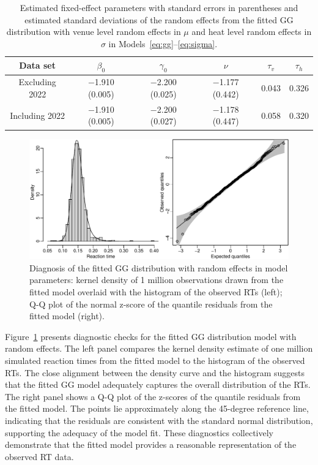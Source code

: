 \documentclass[12pt, letterpaper]{article}
\begin{document}
\begin{table}
  \centering
  \caption{Estimated fixed-effect parameters with standard errors in
    parentheses and estimated standard deviations of the random effects from the
    fitted GG distribution with venue level random
    effects in $\mu$ and heat level random effects in $\sigma$ in
    Models~\eqref{eq:gg}--\eqref{eq:sigma}.}
  \label{tab:ggfit}
  \begin{tabular}{c c c c c c}
    \toprule
    Data set & $\beta_0$ & $\gamma_0$ & $\nu$ & $\tau_v$ & $\tau_h$ \\
    \midrule
    Excluding 2022 & $-$1.910 (0.005) & $-$2.200 (0.025) & $-$1.177 (0.442) & 0.043 & 0.326 \\
    Including 2022 & $-$1.910 (0.005) & $-$2.200 (0.027) & $-$1.178 (0.447) & 0.058 & 0.320 \\
    \bottomrule
  \end{tabular}
\end{table}

\begin{figure}[tbp]
  \centering
  \includegraphics[width=\textwidth]{diagnosis.pdf}
  \caption{Diagnosis of the fitted GG distribution with
    random effects in model parameters: kernel density of 1 million
    observations drawn from the fitted model overlaid with the
    histogram of the observed RTs (left); Q-Q plot of the
    normal z-score of the quantile residuals from the fitted model (right).}
  \label{fig:diagnosis}
\end{figure}


Figure~\ref{fig:diagnosis} presents diagnostic checks for the fitted
GG distribution model with random effects. The left
panel compares the kernel density estimate of one million simulated reaction
times from the fitted model to the histogram of the observed RTs.
The close alignment between the density curve and the histogram suggests that
the fitted GG model adequately captures the overall distribution of the
RTs. The right panel shows a Q-Q plot of the z-scores of the
quantile residuals from the fitted model. The points lie approximately along
the 45-degree reference line, indicating that the residuals are consistent
with the standard normal distribution, supporting the adequacy of the model
fit. These diagnostics collectively demonstrate that the fitted model provides
a reasonable representation of the observed RT data.
\end{document}
